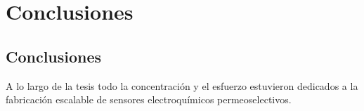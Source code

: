  \newcommand{\NoBiblioConc}[1]{
 \ifthenelse{\equal{#1}{verdadero}}{}{}
 \NoBiblioConc{verdadero}}

 	
 \FormatoCapituloUnaLinea
 
 \chapter{Conclusiones}
 \label{chap:Conclusiones}

 \thispagestyle{empty}
	


 \vfill
 \minitoc
 \newpage

\section*{Conclusiones}

A lo largo de la tesis todo la concentración y el esfuerzo estuvieron dedicados a la fabricación escalable de sensores electroquímicos permeoselectivos. 


